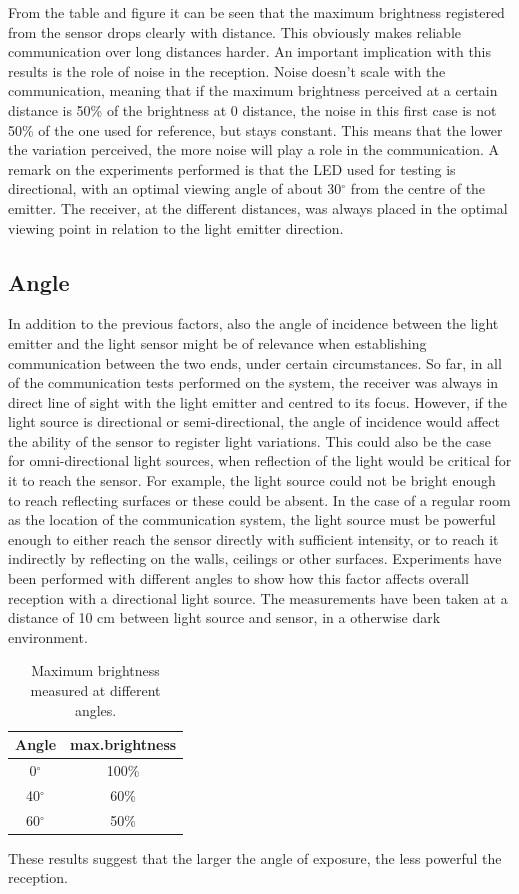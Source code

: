 From the table and figure it can be seen that the maximum brightness registered from the sensor drops clearly with distance.
This obviously makes reliable communication over long distances harder.
An important implication with this results is the role of noise in the reception.
Noise doesn't scale with the communication, meaning that if the maximum brightness perceived at a certain distance is 50\% of the brightness at 0 distance, the noise in this first case is not 50\% of the one used for reference, but stays constant.
This means that the lower the variation perceived, the more noise will play a role in the communication.
A remark on the experiments performed is that the LED used for testing is directional, with an optimal viewing angle of about 30$^{\circ}$ from the centre of the emitter. 
The receiver, at the different distances, was always placed in the optimal viewing point in relation to the light emitter direction.

\subsection{Angle}
In addition to the previous factors, also the angle of incidence between the light emitter and the light sensor might be of relevance when establishing communication between the two ends, under certain circumstances.
So far, in all of the communication tests performed on the system, the receiver was always in direct line of sight with the light emitter and centred to its focus.
However,  if the light source is directional or semi-directional, the angle of incidence would affect the ability of the sensor to register light variations.
This could also be the case for omni-directional light sources, when reflection of the light would be critical for it to reach the sensor.
For example, the light source could not be bright enough to reach reflecting surfaces or these could be absent.
In the case of a regular room as the location of the communication system,  the light source must be powerful enough to either reach the sensor directly with sufficient intensity, or to reach it indirectly by reflecting on the walls, ceilings or other surfaces.
Experiments have been performed with different angles to show how this factor affects overall reception with a directional light source.
The measurements have been taken at a distance of 10 cm between light source and sensor, in a otherwise dark environment.
\begin{table}[hbt]
\centering
  \begin{tabular}{c c}
    Angle & max.brightness \\
    \hline
    0$^{\circ}$ & 100\% \\
    40$^{\circ}$ & 60\% \\
    60$^{\circ}$ & 50\% 
  \end{tabular}
  \caption{Maximum brightness measured at different angles.}
  \label{tab:anglesphy}
\end{table}
These results suggest that the larger the angle of exposure, the less powerful the reception. 

